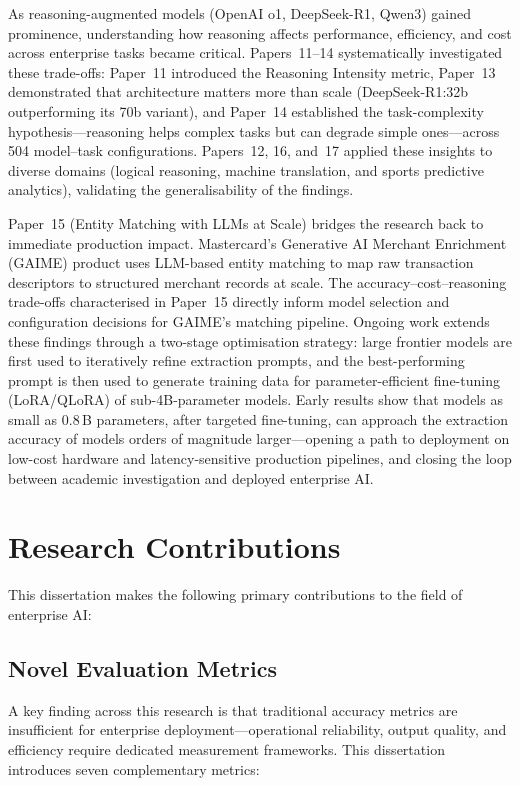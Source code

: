As reasoning-augmented models (OpenAI o1, DeepSeek-R1, Qwen3) gained prominence, understanding how reasoning affects performance, efficiency, and cost across enterprise tasks became critical.  Papers~11--14 systematically investigated these trade-offs: Paper~11 introduced the Reasoning Intensity metric, Paper~13 demonstrated that architecture matters more than scale (DeepSeek-R1:32b outperforming its 70b variant), and Paper~14 established the task-complexity hypothesis---reasoning helps complex tasks but can degrade simple ones---across 504 model--task configurations.  Papers~12, 16, and~17 applied these insights to diverse domains (logical reasoning, machine translation, and sports predictive analytics), validating the generalisability of the findings.

Paper~15 (Entity Matching with LLMs at Scale) bridges the research back to immediate production impact.  Mastercard's Generative AI Merchant Enrichment (GAIME) product uses LLM-based entity matching to map raw transaction descriptors to structured merchant records at scale.  The accuracy--cost--reasoning trade-offs characterised in Paper~15 directly inform model selection and configuration decisions for GAIME's matching pipeline.  Ongoing work extends these findings through a two-stage optimisation strategy: large frontier models are first used to iteratively refine extraction prompts, and the best-performing prompt is then used to generate training data for parameter-efficient fine-tuning (LoRA/QLoRA) of sub-4B-parameter models.  Early results show that models as small as 0.8\,B parameters, after targeted fine-tuning, can approach the extraction accuracy of models orders of magnitude larger---opening a path to deployment on low-cost hardware and latency-sensitive production pipelines, and closing the loop between academic investigation and deployed enterprise AI.

\section{Research Contributions}
\label{sec:contributions}

This dissertation makes the following primary contributions to the field of enterprise AI:

\subsection{Novel Evaluation Metrics}

A key finding across this research is that traditional accuracy metrics are insufficient for enterprise deployment---operational reliability, output quality, and efficiency require dedicated measurement frameworks. This dissertation introduces seven complementary metrics:

